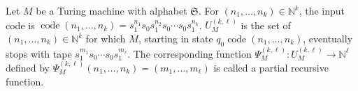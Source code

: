 Let $M$ be a Turing machine with alphabet $\mathfrak{S}$. For $(n_1, \ldots, n_k) \in \mathbb{N}^k$, the input code is $\operatorname{code}(n_1, \ldots, n_k) = s_1^{n_1} s_0 s_1^{n_2} s_0 \cdots s_0 s_1^{n_k}$. $U_M^{(k,\ell)}$ is the set of $(n_1, \ldots, n_k) \in \mathbb{N}^k$ for which $M$, starting in state $q_0 \operatorname{code}(n_1, \ldots, n_k)$, eventually stops with tape $s_1^{m_1} s_0 \cdots s_0 s_1^{m_\ell}$. The corresponding function $\Psi_M^{(k,\ell)}: U_M^{(k,\ell)} \to \mathbb{N}^\ell$ defined by $\Psi_M^{(k,\ell)}(n_1, \ldots, n_k) = (m_1, \ldots, m_\ell)$ is called a partial recursive function.

